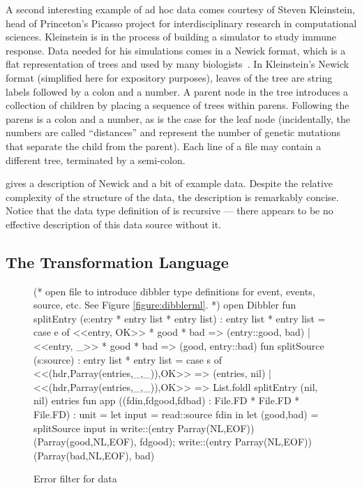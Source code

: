 \documentclass[11pt]{article}
\begin{document}
A second interesting example of ad hoc data comes courtesy of
Steven Kleinstein, head of Princeton's Picasso project for
interdisciplinary research in computational sciences.  
Kleinstein is in the process of 
building a simulator to study immune response.  Data
needed for his simulations comes in a Newick format, which is
a flat representation of trees and used by many biologists~\cite{newick}.  
In Kleinstein's Newick format (simplified
here for expository purposes), leaves of the
tree are string labels followed by a colon and a number.
A parent node in the tree introduces a collection of
children by placing a sequence of trees within parens.
Following the parens is a colon and a number, as is the case
for the leaf node (incidentally, the numbers are called ``distances''
and represent the number of genetic mutations that separate the
child from the parent).  Each line of a file may contain
a different tree, terminated by a semi-colon.

 gives a description of Newick
and a bit of example data.
Despite the relative complexity of the structure of the data, 
the description is remarkably concise.
Notice that the data type definition of  is recursive ---
there appears to be no effective description of this data
source without it.  

\subsection{The \datatype{} Transformation Language}


\begin{figure}
\begin{code}
(* open file to introduce dibbler type definitions for
   event, events, source, etc.  See Figure \ref{figure:dibblerml}. *) 
\mbox{}
open Dibbler
\mbox{}
fun splitEntry (e:entry * entry list * entry list) : entry list * entry list =
  case e of
    <<entry, OK>> * good * bad => (entry::good, bad)
  | <<entry, _>> * good * bad => (good, entry::bad)
\mbox{}    
fun splitSource (s:source) : entry list * entry list =
  case s of 
    <<(hdr,Parray(entries,_,_)),OK>> => (entries, nil)
  | <<(hdr,Parray(entries,_,_)),OK>> =>
    List.foldl splitEntry (nil, nil) entries
\mbox{}
fun app ((fdin,fdgood,fdbad) : File.FD * File.FD * File.FD) : unit =  
  let input = read::source fdin in
  let (good,bad) = splitSource input in
  write::(entry Parray(NL,EOF)) (Parray(good,NL,EOF), fdgood);
  write::(entry Parray(NL,EOF)) (Parray(bad,NL,EOF), bad)
\end{code}
\caption{Error filter for \dibbler{} data}
\label{figure:newick-clean}
\end{figure}
\end{document}
